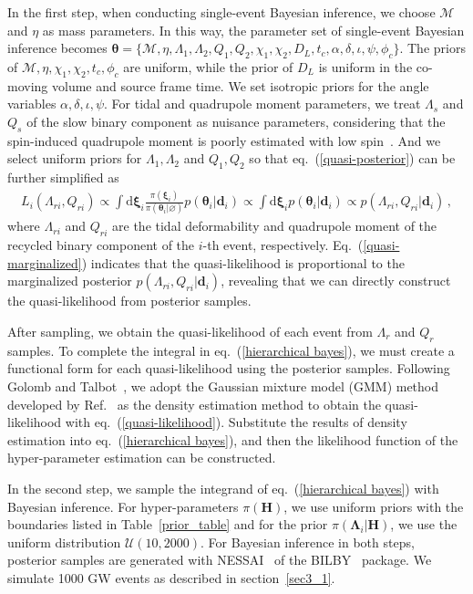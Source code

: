 \documentclass[a4paper,11pt]{article}
\begin{document}
In the first step, when conducting single-event Bayesian inference, we choose $\mathcal{M}$ and $\eta$ as mass parameters. In this way, the parameter set of single-event Bayesian inference becomes $\bm{\theta} = \{\mathcal{M},\eta,\Lambda_1,\Lambda_2,Q_1,Q_2,\chi_1,\chi_2,D_L,t_c,\alpha,\delta,\iota,\psi,\phi_c\}$. The priors of $\mathcal{M},\eta,\chi_1,\chi_2,t_c,\phi_c$ are uniform, while the prior of $D_L$ is uniform in the co-moving volume and source frame time. We set isotropic priors for the angle variables $\alpha,\delta,\iota,\psi$. For tidal and quadrupole moment parameters, we treat $\Lambda_s$ and $Q_s$ of the slow binary component as nuisance parameters, considering that the spin-induced quadrupole moment is poorly estimated with low spin~\cite{Yagi:2013awa}. And we select uniform priors for $\Lambda_1,\Lambda_2$ and $Q_1,Q_2$ so that eq.~(\ref{quasi-posterior}) can be further simplified as
\begin{equation}
    \label{quasi-marginalized}
    \begin{aligned}
        L_i(\Lambda_{ri},Q_{ri}) \propto \int \text{d}\bm{\xi}_i \frac{\pi(\bm{\xi}_i)}{\pi(\bm{\theta}_i|\varnothing)}p(\bm{\theta}_i|\bm{d}_i) \propto \int \text{d}\bm{\xi}_i p(\bm{\theta}_i|\bm{d}_i)\propto p(\Lambda_{ri},Q_{ri}|\bm{d}_i)\,,
    \end{aligned}  
\end{equation}
where $\Lambda_{ri}$ and $Q_{ri}$ are the tidal deformability and quadrupole moment of the recycled binary component of the $i$-th event, respectively. Eq.~(\ref{quasi-marginalized}) indicates that the quasi-likelihood is proportional to the marginalized posterior $p(\Lambda_{ri},Q_{ri}|\bm{d}_i)$, revealing that we can directly construct the quasi-likelihood from posterior samples.

After sampling, we obtain the quasi-likelihood of each event from $\Lambda_r$ and $Q_r$ samples. To complete the integral in eq.~(\ref{hierarchical bayes}), we must create a functional form for each quasi-likelihood using the posterior samples. Following Golomb and Talbot~\cite{Golomb:2021tll}, we adopt the Gaussian mixture model (GMM) method developed by Ref.~\cite{Talbot:2020oeu} as the density estimation method to obtain the quasi-likelihood with eq.~(\ref{quasi-likelihood}). Substitute the results of density estimation into eq.~(\ref{hierarchical bayes}), and then the likelihood function of the hyper-parameter estimation can be constructed.

In the second step, we sample the integrand of eq.~(\ref{hierarchical bayes}) with Bayesian inference. For hyper-parameters $\pi(\bm{H})$, we use uniform priors with the boundaries listed in Table~\ref{prior_table} and for the prior $\pi(\bm{\Lambda}_i|\bm{H})$, we use the uniform distribution $\mathcal{U}(10,2000)$. For Bayesian inference in both steps, posterior samples are generated with {\sc NESSAI}~\cite{Skilling:2004pqw, Skilling:2006gxv, michael_j_williams_2025_14627250, PhysRevD.103.103006, Williams:2023ppp} of the {\sc BILBY}~\cite{Ashton:2018jfp} package. We simulate 1000 GW events as described in section~\ref{sec3_1}. 
\end{document}
